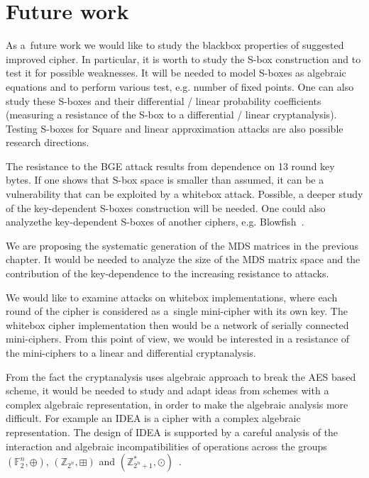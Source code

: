 \documentclass[11pt,oneside,final]{fithesis2}
\begin{document}
\chapter{Future work}\label{sec:futurework}
    As a~future work we would like to study the blackbox properties of suggested improved cipher. In particular, it is worth to study the S-box construction and to test
    it for possible weaknesses. It will be needed to model S-boxes as algebraic equations and to perform various test, e.g. number of fixed points. One can also study these S-boxes
    and their differential / linear probability coefficients (measuring a resistance of the S-box to a differential / linear cryptanalysis). Testing S-boxes 
    for Square and linear approximation attacks are also possible research directions.
    
    The resistance to the BGE attack results from dependence on 13 round key bytes. If one shows that S-box space is smaller than assumed, it can be a vulnerability 
    that can be exploited by a whitebox attack. Possible, a deeper study of the key-dependent S-boxes construction will be needed. One could also analyzethe  key-dependent
    S-boxes of another ciphers, e.g. Blowfish~\citep{Schneier:1993:DNV:647930.740558}. 
    
    We are proposing the systematic generation of the MDS matrices in the previous chapter. It would be needed to analyze the size of the MDS matrix space and
    the contribution of the key-dependence to the increasing resistance to attacks.
    
    We would like to examine attacks on whitebox implementations, where each round of the cipher is considered as a~single mini-cipher with its own key. The whitebox
    cipher implementation then would be a network of serially connected mini-ciphers. From this point of view, we would be interested in a resistance of the mini-ciphers
    to a linear and differential cryptanalysis.

    From the fact the cryptanalysis uses algebraic approach to break the AES based scheme, it would be needed to study and adapt ideas from schemes with a complex algebraic 
    representation, in order to make the algebraic analysis more difficult. For example an IDEA \citep{Lai:1991:PNB:112331.112375} is a cipher 
    with a complex algebraic representation. The design of IDEA is supported by a careful analysis of the interaction and algebraic incompatibilities 
    of operations across the groups $\left(\mathbb{F}_2^n, \oplus\right)$, $\left(\mathbb{Z}_{2^n}, \boxplus\right)$ 
    and $\left(\mathbb{Z}^{\ast}_{2^n+1}, \odot\right)$~\citep{Menezes:1996:HAC:548089}.
    
\end{document}
